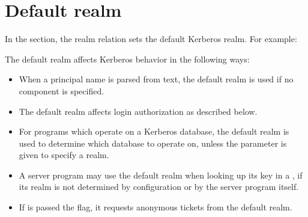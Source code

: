 \documentclass[letterpaper,10pt,english]{sphinxmanual}
\begin{document}
\section{Default realm}
\label{\detokenize{admin/host_config:default-realm}}
\sphinxAtStartPar
In the {\hyperref[\detokenize{admin/conf_files/krb5_conf:libdefaults}]{}} section, the  realm
relation sets the default Kerberos realm.  For example:

\begin{sphinxVerbatim}[commandchars=\\\{\}]
\PYG{p}{[}\PYG{p}{]}
      
\end{sphinxVerbatim}

\sphinxAtStartPar
The default realm affects Kerberos behavior in the following ways:
\begin{itemize}
\item {} 
\sphinxAtStartPar
When a principal name is parsed from text, the default realm is used
if no  component is specified.

\item {} 
\sphinxAtStartPar
The default realm affects login authorization as described below.

\item {} 
\sphinxAtStartPar
For programs which operate on a Kerberos database, the default realm
is used to determine which database to operate on, unless the 
parameter is given to specify a realm.

\item {} 
\sphinxAtStartPar
A server program may use the default realm when looking up its key
in a {\hyperref[\detokenize{admin/install_appl_srv:keytab-file}]{}}, if its realm is not
determined by {\hyperref[\detokenize{admin/conf_files/krb5_conf:domain-realm}]{}} configuration or by the server
program itself.

\item {} 
\sphinxAtStartPar
If  is passed the  flag, it requests anonymous
tickets from the default realm.

\end{itemize}
\end{document}
